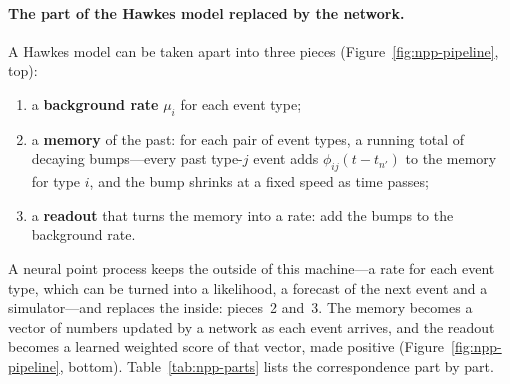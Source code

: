 \paragraph{The part of the Hawkes model replaced by the network.} A Hawkes model can be taken apart into three pieces
(Figure~\ref{fig:npp-pipeline}, top):
\begin{enumerate}[leftmargin=1.8em,itemsep=1pt]
\item a \textbf{background rate} $\mu_i$ for each event type;
\item a \textbf{memory} of the past: for each pair of event types, a running total of decaying bumps---every
  past type-$j$ event adds $\phi_{ij}(t - t_{n'})$ to the memory for type $i$, and the bump shrinks at a fixed
  speed as time passes;
\item a \textbf{readout} that turns the memory into a rate: add the bumps to the background rate.
\end{enumerate}
A neural point process keeps the outside of this machine---a rate for each event type, which can be turned into
a likelihood, a forecast of the next event and a simulator---and replaces the inside: pieces~2 and~3. The
memory becomes a vector of numbers updated by a network as each event arrives, and the readout becomes a
learned weighted score of that vector, made positive (Figure~\ref{fig:npp-pipeline}, bottom).
Table~\ref{tab:npp-parts} lists the correspondence part by part.

